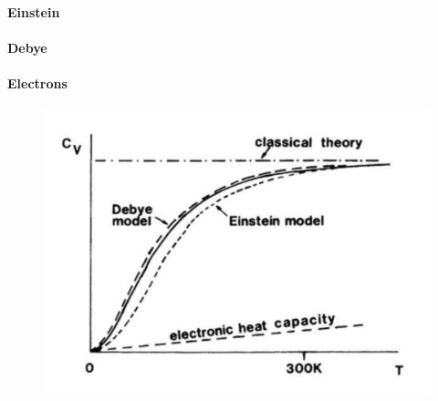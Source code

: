 \paragraph{Einstein}

\paragraph{Debye}

\paragraph{Electrons}

\begin{figure}[H]
	\centering
	\includegraphics[width=0.5\linewidth]{content/graphics/comparison.jpg}
	\caption{\cite{what-when-how}}
	\label{fig:comparison}
\end{figure}
